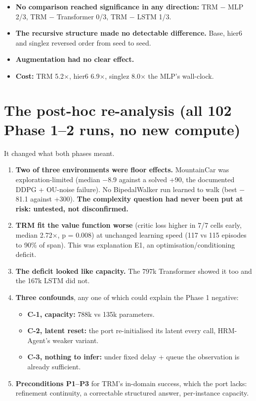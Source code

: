 \documentclass[11pt]{article}
\begin{document}
\begin{itemize}
\item \textbf{No comparison reached significance in any direction:} TRM $-$ MLP 2/3, TRM $-$ Transformer 0/3, TRM $-$ LSTM 1/3.
\item \textbf{The recursive structure made no detectable difference.} Base, hier6 and singlez reversed order from seed to seed.
\item \textbf{Augmentation had no clear effect.}
\item \textbf{Cost:} TRM 5.2$\times$, hier6 6.9$\times$, singlez 8.0$\times$ the MLP's wall-clock.
\end{itemize}



\section*{The post-hoc re-analysis (all 102 Phase 1--2 runs, no new compute)}



It changed what both phases meant.



\begin{enumerate}
\item \textbf{Two of three environments were floor effects.} MountainCar was exploration-limited (median $-$8.9 against a solved +90, the documented DDPG + OU-noise failure). No BipedalWalker run learned to walk (best $-$81.1 against +300). \textbf{The complexity question had never been put at risk: untested, not disconfirmed.}
\item \textbf{TRM fit the value function worse} (critic loss higher in 7/7 cells early, median 2.72$\times$, p = 0.008) at unchanged learning speed (117 vs 115 episodes to 90\% of span). This was explanation E1, an optimisation/conditioning deficit.
\item \textbf{The deficit looked like capacity.} The 797k Transformer showed it too and the 167k LSTM did not.
\item \textbf{Three confounds}, any one of which could explain the Phase 1 negative:
\begin{itemize}
\item \textbf{C-1, capacity:} 788k vs 135k parameters.
\item \textbf{C-2, latent reset:} the port re-initialised its latent every call, HRM-Agent's weaker variant.
\item \textbf{C-3, nothing to infer:} under fixed delay + queue the observation is already sufficient.
\end{itemize}
\item \textbf{Preconditions P1--P3} for TRM's in-domain success, which the port lacks: refinement continuity, a correctable structured answer, per-instance capacity.
\end{enumerate}
\end{document}
